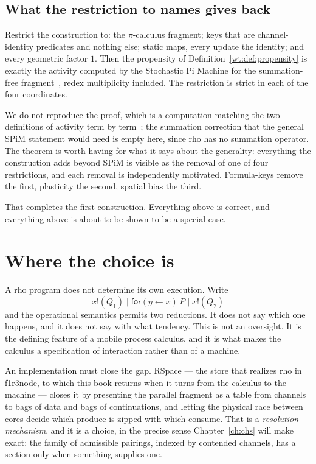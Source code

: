 \subsection{What the restriction to names gives back}
\label{wt:sec:spim}

\begin{theorem}
\label{wt:thm:spim}
Restrict the construction to: the $\pi$-calculus fragment; keys that are channel-identity
predicates and nothing else; static maps, every update the identity; and every geometric
factor $1$. Then the propensity of Definition~\ref{wt:def:propensity} is exactly the
activity computed by the Stochastic Pi Machine for the summation-free
fragment~\cite{spim}, redex multiplicity included. The restriction is strict in each of
the four coordinates.
\end{theorem}

We do not reproduce the proof, which is a computation matching the two definitions of
activity term by term~\cite{StochSim}; the summation correction that the general SPiM
statement would need is empty here, since rho has no summation operator. The theorem is
worth having for what it says about the generality: everything the construction adds
beyond SPiM is visible as the removal of one of four restrictions, and each removal is
independently motivated. Formula-keys remove the first, plasticity the second, spatial
bias the third.

That completes the first construction. Everything above is correct, and everything
above is about to be shown to be a special case.

\section{Where the choice is}
\label{gw:sec:choice}

A rho program does not determine its own execution. Write
\begin{equation}
\label{gw:eq:race}
  x!(Q_1) \mid \textsf{for}(y \leftarrow x)\,P \mid x!(Q_2)
\end{equation}
and the operational semantics permits two reductions. It does not say which one happens,
and it does not say with what tendency. This is not an oversight. It is the defining
feature of a mobile process calculus, and it is what makes the calculus a specification
of interaction rather than of a machine.

An implementation must close the gap. RSpace --- the store that realizes rho in
f1r3node, to which this book returns when it turns from the calculus to the machine ---
closes it by presenting the
parallel fragment as a table from channels to bags of data and bags of continuations,
and letting the physical race between cores decide which produce is zipped with which
consume. That is a \emph{resolution mechanism}, and it is a choice, in the precise sense
Chapter~\ref{ch:chs} will make exact: the family of admissible pairings, indexed by
contended channels, has a section only when something supplies one.

